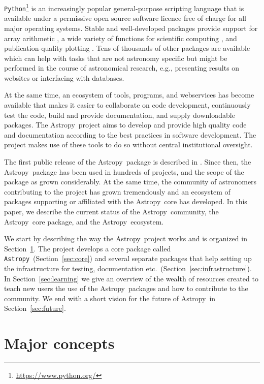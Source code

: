 \documentclass[modern]{aastex61}
\newcommand{\package}[1]{\texttt{#1}}
\newcommand{\python}{\package{Python}}
\newcommand{\astropy}{Astropy}
\newcommand{\astropypkg}{\package{Astropy}}
\newcommand{\sectionname}{Section}
\begin{document}
\python\footnote{\url{https://www.python.org/}} is an increasingly popular
general-purpose scripting language that is available under a permissive open
source software licence free of charge for all major operating systems. Stable
and well-developed packages provide support for array arithmetic
\citep[\package{numpy},][]{numpy}, a wide variety of functions for scientific
computing \citep[\package{scipy},][]{numpy}, and publication-quality plotting
\citep[\package{matplotlib},][]{matplotlib}. Tens of thousands of other packages
are available which can help with tasks that are not astronomy specific but
might be performed in the course of astronomical research, e.g., presenting
results on websites or interfacing with databases.

At the same time, an ecosystem of tools, programs, and webservices
has become available that makes it easier to collaborate on code development,
continuously test the code, build and provide documentation, and
supply downloadable packages. The \astropy\ project aims to develop and
provide high quality code and documentation according to the best
practices in software development. The project makes use of these
tools to do so without central institutional oversight.

The first public release of the \astropy\ package is described in
\cite{astropy}. Since then, the \astropy\ package has been
used in hundreds of projects, and the scope of the package as grown
considerably. At the same time, the community of astronomers
contributing to the project has grown tremendously and an ecosystem
of packages supporting or affiliated with the \astropy\ core has
developed. In this paper, we describe the current status of the
\astropy\ community, the \astropy\ core package, and the \astropy\
ecosystem.

We start by describing the way the \astropy\ project works and is
organized in \sectionname~\ref{sec:concepts}.  The project develops a core
package called \astropypkg\ (\sectionname~\ref{sec:core}) and several
separate packages that help setting up the infrastructure for testing,
documentation etc.\ (\sectionname~\ref{sec:infrastructure}). In
\sectionname~\ref{sec:learning} we give an overview of the wealth of
resources created to teach new users the use of the \astropy\ packages
and how to contribute to the community. We end with a short vision for
the future of \astropy\ in \sectionname~\ref{sec:future}.



\section{Major concepts}
\label{sec:concepts}
\end{document}
